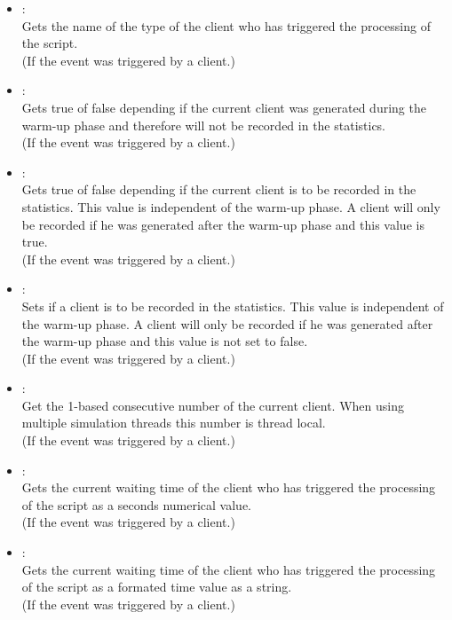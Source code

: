 \begin{itemize}

\item
{}:\\
Gets the name of the type of the client who has triggered the processing of the script.\\
(If the event was triggered by a client.)

\item
{}:\\
Gets true of false depending if the current client was generated during the warm-up phase and
therefore will not be recorded in the statistics.\\
(If the event was triggered by a client.)

\item
{}:\\
Gets true of false depending if the current client is to be recorded in the statistics.
This value is independent of the warm-up phase. A client will only be recorded if he was
generated after the warm-up phase and this value is true.\\
(If the event was triggered by a client.)

\item
{}:\\
Sets if a client is to be recorded in the statistics.
This value is independent of the warm-up phase. A client will only be recorded if he was
generated after the warm-up phase and this value is not set to false.\\
(If the event was triggered by a client.)

\item
{}:\\
Get the 1-based consecutive number of the current client.
When using multiple simulation threads this number is thread local.\\
(If the event was triggered by a client.)

\item
{}:\\
Gets the current waiting time of the client who has triggered the processing of the script as a seconds numerical value.\\
(If the event was triggered by a client.)

\item
{}:\\
Gets the current waiting time of the client who has triggered the processing of the script as a formated time value as a string.\\
(If the event was triggered by a client.)


\end{itemize}

